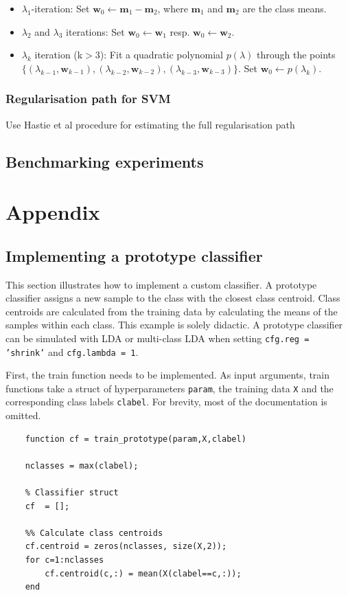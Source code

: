 \documentclass[utf8]{frontiersSCNS} %
\newcommand{\m}{\mathbf{m}}
\newcommand{\w}{\mathbf{w}}
\newcommand{\ttt}[1]{\texttt{#1}}
\begin{document}
\begin{itemize}
\item $\lambda_1$-iteration: Set $\w_0\leftarrow \m_1 - \m_2$, where $\m_1$ and $\m_2$ are the class means.
\item $\lambda_2$ and $\lambda_3$ iterations: Set $\w_0\leftarrow \w_1$ resp. $\w_0\leftarrow \w_2$.
\item $\lambda_k$ iteration (k$>$3): Fit a quadratic polynomial $p(\lambda)$ through the points $\{(\lambda_{k-1},\w_{k-1}), (\lambda_{k-2},\w_{k-2}), (\lambda_{k-3},\w_{k-3})\}$. Set $\w_0 \leftarrow p(\lambda_k)$.
\end{itemize}

\subsubsection{Regularisation path for SVM}
Use Hastie et al procedure for estimating the full regularisation path


\subsection{Benchmarking experiments}


\section{Appendix}

\subsection{Implementing a prototype classifier}

This section illustrates how to implement a custom classifier. A prototype classifier assigns a new sample to the class with the closest class centroid. Class centroids are calculated from the training data by calculating the means of the samples within each class. This example is solely didactic. A prototype classifier can be simulated with LDA or multi-class LDA when setting \ttt{cfg.reg = 'shrink'} and \ttt{cfg.lambda = 1}.

First, the train function needs to be implemented. As input arguments, train functions  take a  struct of hyperparameters \ttt{param},  the training data \ttt{X} and the corresponding  class labels \ttt{clabel}. For brevity, most of the documentation is omitted.

\begin{verbatim}
    function cf = train_prototype(param,X,clabel)

    nclasses = max(clabel);

    % Classifier struct
    cf  = [];

    %% Calculate class centroids
    cf.centroid = zeros(nclasses, size(X,2));
    for c=1:nclasses
        cf.centroid(c,:) = mean(X(clabel==c,:));
    end
\end{verbatim}
\end{document}
